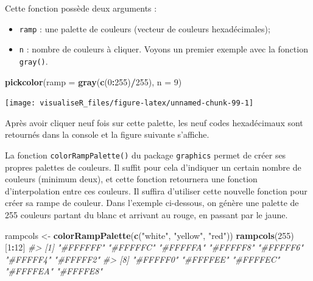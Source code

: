 \documentclass[]{article}
\newenvironment{Shaded}{\begin{snugshade}}{\end{snugshade}}
\newcommand{\CommentTok}[1]{\textcolor[rgb]{0.56,0.35,0.01}{\textit{#1}}}
\newcommand{\DataTypeTok}[1]{\textcolor[rgb]{0.13,0.29,0.53}{#1}}
\newcommand{\DecValTok}[1]{\textcolor[rgb]{0.00,0.00,0.81}{#1}}
\newcommand{\KeywordTok}[1]{\textcolor[rgb]{0.13,0.29,0.53}{\textbf{#1}}}
\newcommand{\NormalTok}[1]{#1}
\newcommand{\OperatorTok}[1]{\textcolor[rgb]{0.81,0.36,0.00}{\textbf{#1}}}
\newcommand{\StringTok}[1]{\textcolor[rgb]{0.31,0.60,0.02}{#1}}
\providecommand{\tightlist}{%
  \setlength{\itemsep}{0pt}\setlength{\parskip}{0pt}}
\begin{document}
Cette fonction possède deux arguments :

\begin{itemize}
\tightlist
\item
  \texttt{ramp} : une palette de couleurs (vecteur de couleurs hexadécimales);
\item
  \texttt{n} : nombre de couleurs à cliquer.
  Voyons un premier exemple avec la fonction \texttt{gray()}.
\end{itemize}

\begin{Shaded}
\begin{Highlighting}[]
\KeywordTok{pickcolor}\NormalTok{(}\DataTypeTok{ramp =} \KeywordTok{gray}\NormalTok{(}\KeywordTok{c}\NormalTok{(}\DecValTok{0}\OperatorTok{:}\DecValTok{255}\NormalTok{)}\OperatorTok{/}\DecValTok{255}\NormalTok{), }\DataTypeTok{n =} \DecValTok{9}\NormalTok{)}
\end{Highlighting}
\end{Shaded}

\begin{center}\texttt{[image: visualiseR\_files/figure-latex/unnamed-chunk-99-1]} \end{center}

Après avoir cliquer neuf fois sur cette palette, les neuf codes hexadécimaux sont retournés dans la console et la figure suivante s'affiche.

La fonction \texttt{colorRampPalette()} du package \texttt{graphics} permet de créer ses propres palettes de couleurs. Il suffit pour cela d'indiquer un certain nombre de couleurs (minimum deux), et cette fonction retournera une fonction d'interpolation entre ces couleurs. Il suffira d'utiliser cette nouvelle fonction pour créer sa rampe de couleur. Dans l'exemple ci-dessous, on génère une palette de 255 couleurs partant du blanc et arrivant au rouge, en passant par le jaune.

\begin{Shaded}
\begin{Highlighting}[]
\NormalTok{rampcols <-}\StringTok{ }\KeywordTok{colorRampPalette}\NormalTok{(}\KeywordTok{c}\NormalTok{(}\StringTok{"white"}\NormalTok{, }\StringTok{"yellow"}\NormalTok{, }\StringTok{"red"}\NormalTok{))}
\KeywordTok{rampcols}\NormalTok{(}\DecValTok{255}\NormalTok{)[}\DecValTok{1}\OperatorTok{:}\DecValTok{12}\NormalTok{]}
\CommentTok{#>  [1] "#FFFFFF" "#FFFFFC" "#FFFFFA" "#FFFFF8" "#FFFFF6" "#FFFFF4" "#FFFFF2"}
\CommentTok{#>  [8] "#FFFFF0" "#FFFFEE" "#FFFFEC" "#FFFFEA" "#FFFFE8"}
\end{Highlighting}
\end{Shaded}
\end{document}
